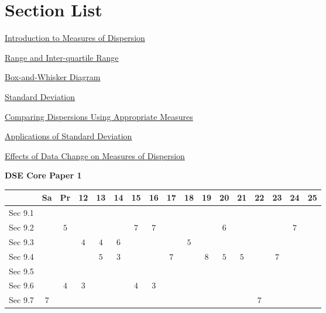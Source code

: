\documentclass[12pt, a4paper]{article}
\begin{document}
\section*{Section List}
\begin{enumx}[label=Sec 9.\arabic*\ ]
\item \hyperref[section:5-9-1]{Introduction to Measures of Dispersion}
\item \hyperref[section:5-9-2]{Range and Inter-quartile Range}
\item \hyperref[section:5-9-3]{Box-and-Whisker Diagram}
\item \hyperref[section:5-9-4]{Standard Deviation}
\item \hyperref[section:5-9-5]{Comparing Dispersions Using Appropriate Measures}
\item \hyperref[section:5-9-6]{Applications of Standard  Deviation \NF}
\item \hyperref[section:5-9-7]{Effects of Data Change on  Measures of Dispersion \NF}
\end{enumx}
\begin{absolutelynopagebreak}
\begin{center}
\textbf{DSE Core Paper 1}
\end{center}
\begin{center}
\begin{tabular}{|l|c|c|c|c|c|c|c|c|c|c|c|c|c|c|c|c|}
\hline
        & Sa & Pr & 12 & 13 & 14 & 15 & 16 & 17 & 18 & 19 & 20 & 21 & 22 & 23 & 24 & 25 \\\hline\hline
Sec 9.1 &  &  &  &  &  &  &  &  &  &  &  &  &  &  &  &  \\\hline
Sec 9.2 &  &  $5$ &  &  &  &  $7$ &  $7$ &  &  &  &  $6$ &  &  &  &  $7$ &  \\\hline
Sec 9.3 &  &  &  $4$ &  $4$ &  $6$ &  &  &  &  $5$ &  &  &  &  &  &  &  \\\hline
Sec 9.4 &  &  &  &  $5$ &  $3$ &  &  &  $7$ &  &  $8$ &  $5$ &  $5$ &  &  $7$ &  &  \\\hline
Sec 9.5 &  &  &  &  &  &  &  &  &  &  &  &  &  &  &  &  \\\hline
Sec 9.6 &  &  $4$ &  $3$ &  &  &  $4$ &  $3$ &  &  &  &  &  &  &  &  &  \\\hline
Sec 9.7 &  $7$ &  &  &  &  &  &  &  &  &  &  &  &  $7$ &  &  &  \\\hline
\end{tabular}
\end{center}
\end{absolutelynopagebreak}
\end{document}
